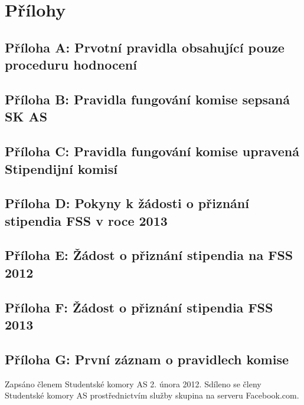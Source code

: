 
\chapter{Přílohy}

\cleartoleftpage
\section{Příloha A: Prvotní pravidla obsahující pouze proceduru hodnocení}


\cleartoleftpage
\section{Příloha B: Pravidla fungování komise sepsaná SK AS}


\cleartoleftpage
\section{Příloha C: Pravidla fungování komise upravená Stipendijní komisí}


\cleartoleftpage
\section{Příloha D: Pokyny k žádosti o přiznání stipendia FSS v roce 2013}


\cleartoleftpage
\section{Příloha E: Žádost o přiznání stipendia na FSS 2012}


\cleartoleftpage
\section{Příloha F: Žádost o přiznání stipendia FSS 2013}


\cleartoleftpage
\section{Příloha G: První záznam o pravidlech komise}

Zapsáno členem Studentské komory AS 2. února 2012. Sdíleno se členy Studentské komory AS prostřednictvím služby skupina na serveru Facebook.com.

